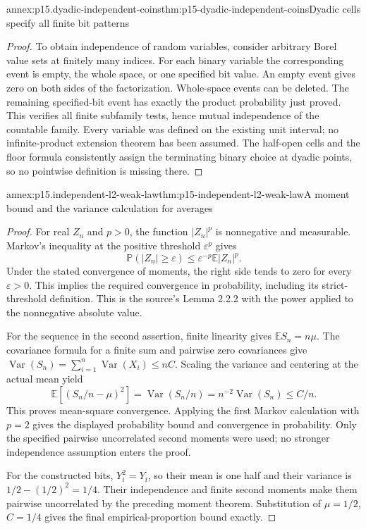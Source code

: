 \begin{annexitem}{annex:p15.dyadic-independent-coins}{thm:p15-dyadic-independent-coins}{Dyadic cells specify all finite bit patterns}
\begin{proof}
To obtain independence of random variables, consider arbitrary
Borel value sets at finitely many indices. For each binary variable
the corresponding event is empty, the whole space, or one specified
bit value. An empty event gives zero on both sides of the
factorization. Whole-space events can be deleted. The remaining
specified-bit event has exactly the product probability just proved.
This verifies all finite subfamily tests, hence mutual independence
of the countable family. Every variable was defined on the existing
unit interval; no infinite-product extension theorem has been assumed.
The half-open cells and the floor formula consistently assign the
terminating binary choice at dyadic points, so no pointwise definition
is missing there.
\end{proof}
\end{annexitem}

\begin{annexitem}{annex:p15.independent-l2-weak-law}{thm:p15-independent-l2-weak-law}{A moment bound and the variance calculation for averages}
\begin{proof}
For real \(Z_n\) and \(p>0\), the function \(|Z_n|^p\)
is nonnegative and measurable. Markov's inequality at the positive
threshold \(\varepsilon^p\) gives
\[
 \mathbb P(|Z_n|\geq\varepsilon)
             \leq\varepsilon^{-p}\mathbb E|Z_n|^p.
\]
Under the stated convergence of moments, the right side tends to
zero for every \(\varepsilon>0\). This implies the required
convergence in probability, including its strict-threshold definition.
This is the source's Lemma 2.2.2 with the power applied to the
nonnegative absolute value.

For the sequence in the second assertion, finite linearity gives
\(\mathbb E S_n=n\mu\). The covariance formula for a finite
sum and pairwise zero covariances give
\(\operatorname{Var}(S_n)=\sum_{i=1}^n\operatorname{Var}(X_i)\leq nC\).
Scaling the variance and centering at the actual mean yield
\[
 \mathbb E[(S_n/n-\mu)^2]
       =\operatorname{Var}(S_n/n)
       =n^{-2}\operatorname{Var}(S_n)\leq C/n.
\]
This proves mean-square convergence. Applying the first Markov
calculation with \(p=2\) gives the displayed probability bound
and convergence in probability. Only the specified pairwise
uncorrelated second moments were used; no stronger independence
assumption enters the proof.

For the constructed bits, \(Y_i^2=Y_i\), so their mean is
one half and their variance is \(1/2-(1/2)^2=1/4\).
Their independence and finite second moments make them pairwise
uncorrelated by the preceding moment theorem. Substitution of
\(\mu=1/2\), \(C=1/4\) gives the final empirical-proportion
bound exactly.
\end{proof}
\end{annexitem}
